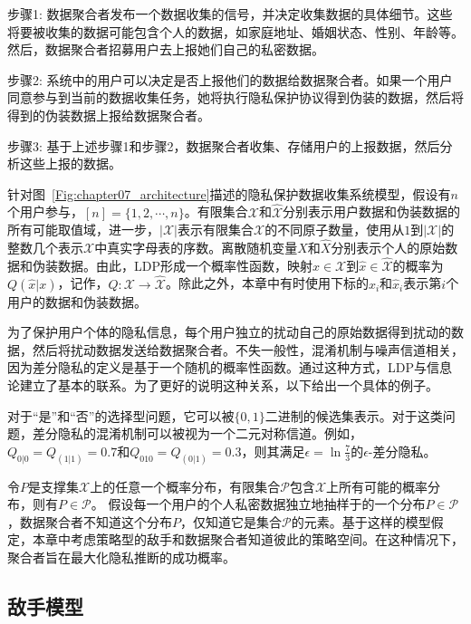 步骤1: 数据聚合者发布一个数据收集的信号，并决定收集数据的具体细节。这些将要被收集的数据可能包含个人的数据，如家庭地址、婚姻状态、性别、年龄等。然后，数据聚合者招募用户去上报她们自己的私密数据。

步骤2: 系统中的用户可以决定是否上报他们的数据给数据聚合者。如果一个用户同意参与到当前的数据收集任务，她将执行隐私保护协议得到伪装的数据，然后将得到的伪装数据上报给数据聚合者。

步骤3: 基于上述步骤1和步骤2，数据聚合者收集、存储用户的上报数据，然后分析这些上报的数据。


针对图~\ref{Fig:chapter07_architecture}描述的隐私保护数据收集系统模型，假设有$n$个用户参与，$[n]=\{1,2,\cdots,n\}$。有限集合$\mathcal{X}$和$\hat{\mathcal{X}}$分别表示用户数据和伪装数据的所有可能取值域，进一步，$|\mathcal{X}|$表示有限集合$\mathcal{X}$的不同原子数量，使用从$1$到$|\mathcal{X}|$的整数几个表示$\mathcal{X}$中真实字母表的序数。离散随机变量$X$和$\hat{X}$分别表示个人的原始数据和伪装数据。由此，LDP形成一个概率性函数，映射$x \in \mathcal{X}$到$\hat{x} \in \hat{\mathcal{X}}$的概率为$Q(\hat{x}|x)$，记作，$Q:\mathcal{X}\rightarrow \hat{\mathcal{X}}$。除此之外，本章中有时使用下标的$x_i$和$\hat{x}_i$表示第$i$个用户的数据和伪装数据。

为了保护用户个体的隐私信息，每个用户独立的扰动自己的原始数据得到扰动的数据，然后将扰动数据发送给数据聚合者。不失一般性，混淆机制与噪声信道相关，因为差分隐私的定义是基于一个随机的概率性函数。通过这种方式，LDP与信息论建立了基本的联系。为了更好的说明这种关系，以下给出一个具体的例子。

\begin{example}对于``是''和``否''的选择型问题，它可以被$\{0,1\}$二进制的候选集表示。对于这类问题，差分隐私的混淆机制可以被视为一个二元对称信道。例如，$Q_{0|0}=Q_{(1|1)}=0.7$和$Q_{010}=Q_{(0|1)}=0.3$，则其满足$\epsilon=\ln \frac{7}{3}$的$\epsilon$-差分隐私。
\end{example}

令$P$是支撑集$\mathcal{X}$上的任意一个概率分布，有限集合$\mathcal{P}$包含$\mathcal{X}$上所有可能的概率分布，则有$P\in \mathcal{P}$。 假设每一个用户的个人私密数据独立地抽样于的一个分布$P\in \mathcal{P}$，数据聚合者不知道这个分布$P$，仅知道它是集合$\mathcal{P}$的元素。基于这样的模型假定，本章中考虑策略型的敌手和数据聚合者知道彼此的策略空间。在这种情况下，聚合者旨在最大化隐私推断的成功概率。
\subsection{敌手模型}\label{adversary:model}

